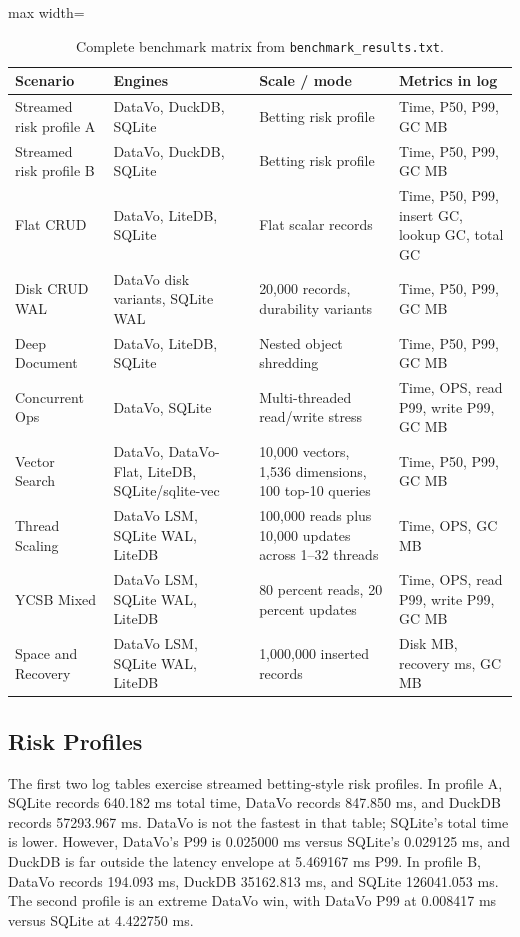 \documentclass[11pt]{article}
\begin{document}
\begin{table}[H]
\caption{Complete benchmark matrix from \texttt{benchmark\_results.txt}.}
\label{tab:matrix}
\centering
\small
\begin{adjustbox}{max width=\textwidth}
\begin{tabular}{llll}
\toprule
Scenario & Engines & Scale / mode & Metrics in log \\
\midrule
Streamed risk profile A & DataVo, DuckDB, SQLite & Betting risk profile & Time, P50, P99, GC MB \\
Streamed risk profile B & DataVo, DuckDB, SQLite & Betting risk profile & Time, P50, P99, GC MB \\
Flat CRUD & DataVo, LiteDB, SQLite & Flat scalar records & Time, P50, P99, insert GC, lookup GC, total GC \\
Disk CRUD WAL & DataVo disk variants, SQLite WAL & 20,000 records, durability variants & Time, P50, P99, GC MB \\
Deep Document & DataVo, LiteDB, SQLite & Nested object shredding & Time, P50, P99, GC MB \\
Concurrent Ops & DataVo, SQLite & Multi-threaded read/write stress & Time, OPS, read P99, write P99, GC MB \\
Vector Search & DataVo, DataVo-Flat, LiteDB, SQLite/sqlite-vec & 10,000 vectors, 1,536 dimensions, 100 top-10 queries & Time, P50, P99, GC MB \\
Thread Scaling & DataVo LSM, SQLite WAL, LiteDB & 100,000 reads plus 10,000 updates across 1--32 threads & Time, OPS, GC MB \\
YCSB Mixed & DataVo LSM, SQLite WAL, LiteDB & 80 percent reads, 20 percent updates & Time, OPS, read P99, write P99, GC MB \\
Space and Recovery & DataVo LSM, SQLite WAL, LiteDB & 1,000,000 inserted records & Disk MB, recovery ms, GC MB \\
\bottomrule
\end{tabular}
\end{adjustbox}
\end{table}

\FloatBarrier

\subsection{Risk Profiles}
The first two log tables exercise streamed betting-style risk profiles. In profile A, SQLite records \num{640.182} ms total time, DataVo records \num{847.850} ms, and DuckDB records \num{57293.967} ms. DataVo is not the fastest in that table; SQLite's total time is lower. However, DataVo's P99 is \num{0.025000} ms versus SQLite's \num{0.029125} ms, and DuckDB is far outside the latency envelope at \num{5.469167} ms P99. In profile B, DataVo records \num{194.093} ms, DuckDB \num{35162.813} ms, and SQLite \num{126041.053} ms. The second profile is an extreme DataVo win, with DataVo P99 at \num{0.008417} ms versus SQLite at \num{4.422750} ms.
\end{document}
